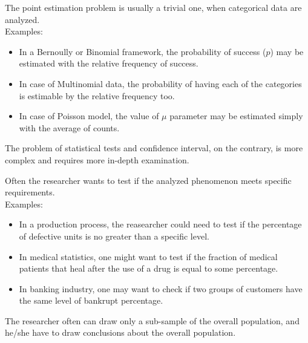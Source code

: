 
\begin{frame}
  The point estimation problem is usually a trivial one, when categorical data are analyzed.\\
  \vspace*{.5cm}
  Examples: 
  \begin{itemize}
    \item In a Bernoully or Binomial framework, the probability of success ($p$) may be estimated with the relative frequency of success.
    \item In case of Multinomial data, the probability of having each of the categories is estimable by the relative frequency too.
    \item In case of Poisson model, the value of $\mu$ parameter may be estimated simply with the average of counts.
  \end{itemize}
  \vspace*{.5cm}
  The problem of statistical tests and confidence interval, on the contrary, is more complex and requires more in-depth examination.
\end{frame}




\begin{frame}
  Often the researcher wants to test if the analyzed phenomenon meets specific requirements.\\
  \vspace*{.5cm}
  Examples: 
  \begin{itemize}
    \item In a production process, the reasearcher could need to test if the percentage of defective units is no greater than a specific level.
    \item In medical statistics, one might want to test if the fraction of medical patients that heal after the use of a drug is equal to some percentage.
    \item In banking industry, one may want to check if two groups of customers have the same level of bankrupt percentage.
  \end{itemize}
  \vspace*{.5cm}
  The researcher often can draw only a sub-sample of the overall population, and he/she have to draw conclusions about the overall population.
\end{frame}

